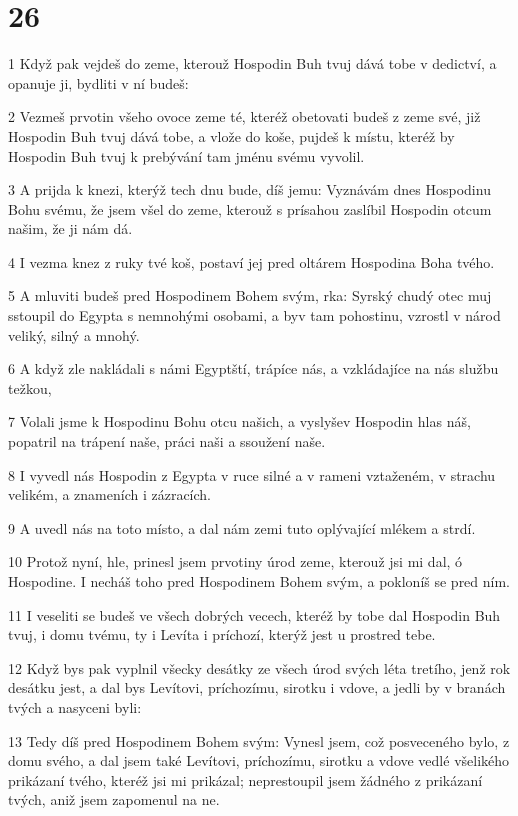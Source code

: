\chapter{26}

\par 1 Když pak vejdeš do zeme, kterouž Hospodin Buh tvuj dává tobe v dedictví, a opanuje ji, bydliti v ní budeš:
\par 2 Vezmeš prvotin všeho ovoce zeme té, kteréž obetovati budeš z zeme své, již Hospodin Buh tvuj dává tobe, a vlože do koše, pujdeš k místu, kteréž by Hospodin Buh tvuj k prebývání tam jménu svému vyvolil.
\par 3 A prijda k knezi, kterýž tech dnu bude, díš jemu: Vyznávám dnes Hospodinu Bohu svému, že jsem všel do zeme, kterouž s prísahou zaslíbil Hospodin otcum našim, že ji nám dá.
\par 4 I vezma knez z ruky tvé koš, postaví jej pred oltárem Hospodina Boha tvého.
\par 5 A mluviti budeš pred Hospodinem Bohem svým, rka: Syrský chudý otec muj sstoupil do Egypta s nemnohými osobami, a byv tam pohostinu, vzrostl v národ veliký, silný a mnohý.
\par 6 A když zle nakládali s námi Egyptští, trápíce nás, a vzkládajíce na nás službu težkou,
\par 7 Volali jsme k Hospodinu Bohu otcu našich, a vyslyšev Hospodin hlas náš, popatril na trápení naše, práci naši a ssoužení naše.
\par 8 I vyvedl nás Hospodin z Egypta v ruce silné a v rameni vztaženém, v strachu velikém, a znameních i zázracích.
\par 9 A uvedl nás na toto místo, a dal nám zemi tuto oplývající mlékem a strdí.
\par 10 Protož nyní, hle, prinesl jsem prvotiny úrod zeme, kterouž jsi mi dal, ó Hospodine. I necháš toho pred Hospodinem Bohem svým, a pokloníš se pred ním.
\par 11 I veseliti se budeš ve všech dobrých vecech, kteréž by tobe dal Hospodin Buh tvuj, i domu tvému, ty i Levíta i príchozí, kterýž jest u prostred tebe.
\par 12 Když bys pak vyplnil všecky desátky ze všech úrod svých léta tretího, jenž rok desátku jest, a dal bys Levítovi, príchozímu, sirotku i vdove, a jedli by v branách tvých a nasyceni byli:
\par 13 Tedy díš pred Hospodinem Bohem svým: Vynesl jsem, což posveceného bylo, z domu svého, a dal jsem také Levítovi, príchozímu, sirotku a vdove vedlé všelikého prikázaní tvého, kteréž jsi mi prikázal; neprestoupil jsem žádného z prikázaní tvých, aniž jsem zapomenul na ne.
